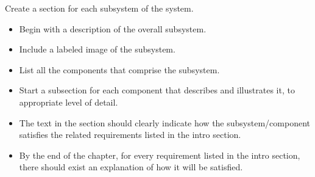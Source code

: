 Create a section for each subsystem of the system.

\begin{itemize}
\item Begin with a description of the overall subsystem.
\item Include a labeled image of the subsystem.  
\item List all the components that comprise the subsystem.
\item Start a subsection for each component that describes and illustrates it, to appropriate level of detail.
\item The text in the section should clearly indicate how the subsystem/component satisfies the related requirements listed in the intro section.
\item By the end of the chapter, for every requirement listed in the intro section, there should exist an explanation of how it will be satisfied.
\end{itemize}
